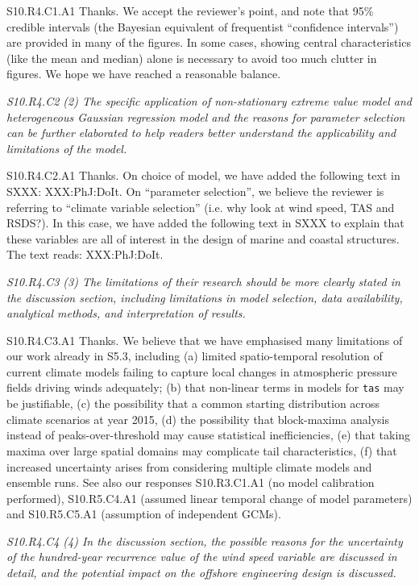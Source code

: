 \documentclass[a4paper,10pt]{article}
\providecommand{\TA}{\texttt{tas}\xspace}
\begin{document}
	S10.R4.C1.A1 Thanks. We accept the reviewer's point, and note that 95\% credible intervals (the Bayesian equivalent of frequentist ``confidence intervals'') are provided in many of the figures. In some cases, showing central characteristics (like the mean and median) alone is necessary to avoid too much clutter in figures. We hope we have reached a reasonable balance.

	\emph{S10.R4.C2 (2) The specific application of non-stationary extreme value model and heterogeneous Gaussian regression model and the reasons for parameter selection can be further elaborated to help readers better understand the applicability and limitations of the model.}

	S10.R4.C2.A1 Thanks. On choice of model, we have added the following text in SXXX: XXX:PhJ:DoIt. On ``parameter selection'', we believe the reviewer is referring to ``climate variable selection'' (i.e. why look at wind speed, TAS and RSDS?). In this case, we have added the following text in SXXX to explain that these variables are all of interest in the design of marine and coastal structures. The text reads: XXX:PhJ:DoIt.

	\emph{S10.R4.C3 (3) The limitations of their research should be more clearly stated in the discussion section, including limitations in model selection, data availability, analytical methods, and interpretation of results.}

	S10.R4.C3.A1 Thanks. We believe that we have emphasised many limitations of our work already in S5.3, including (a) limited spatio-temporal resolution of current climate models failing to capture local changes in atmospheric pressure fields driving winds adequately; (b) that non-linear terms in models for \TA may be justifiable, (c) the possibility that a common starting distribution across climate scenarios at year 2015, (d) the possibility that block-maxima analysis instead of peaks-over-threshold may cause statistical inefficiencies, (e) that taking maxima over large spatial domains may complicate tail characteristics, (f) that increased uncertainty arises from considering multiple climate models and ensemble runs. See also our responses S10.R3.C1.A1 (no model calibration performed), S10.R5.C4.A1 (assumed linear temporal change of model parameters) and S10.R5.C5.A1 (assumption of independent GCMs).

	\emph{S10.R4.C4 (4) In the discussion section, the possible reasons for the uncertainty of the hundred-year recurrence value of the wind speed variable are discussed in detail, and the potential impact on the offshore engineering design is discussed.}
\end{document}
